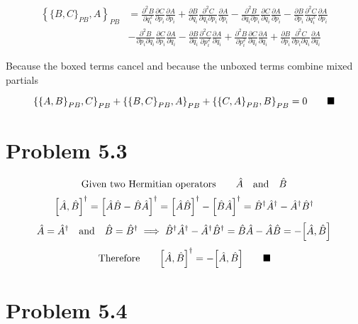 \documentclass{article}
\begin{document}
\begin{align*} \left\{ \{B,C\}_{PB},A \right\}_{PB}  
  &=  \boxed{\frac{\partial^2 B}{\partial q_{i}^2}				\frac{\partial C}{\partial p_{i}}\frac{\partial A}{\partial p_{i}}}
						+\frac{\partial B}{\partial q_{i}}						\frac{\partial^2 C}{\partial q_{i}\partial p_{i}} \frac{\partial A}{\partial p_{i}}
						-\frac{\partial^2 B}{\partial q_{i}\partial p_{i}}\frac{\partial C}{\partial q_{i}}\frac{\partial A}{\partial p_{i}}
						-\boxed{\frac{\partial B}{\partial p_{i}}						\frac{\partial^2 C}{\partial q_{i}^2} \frac{\partial A}{\partial p_{i}} } \\
		& -	\frac{\partial^2 B}{\partial p_{i}\partial q_{i}} \frac{\partial C}{\partial p_{i}}\frac{\partial A}{\partial q_{i}}
						-\boxed{\frac{\partial B}{\partial q_{i}}						\frac{\partial^2 C}{\partial p_{i}^2} \frac{\partial A}{\partial q_{i}}}
						+\boxed{\frac{\partial^2 B}{\partial p_{i}^2}				\frac{\partial C}{\partial q_{i}}\frac{\partial A}{\partial q_{i}}}
						+\frac{\partial B}{\partial p_{i}} 						\frac{\partial^2 C}{\partial p_{i}\partial q_{i}} \frac{\partial A}{\partial q_{i}} \end{align*}

Because the boxed terms cancel and because the unboxed terms combine mixed partials								

\[ \qty{ \qty{A,B}_{PB},C }_{PB}+\qty{ \qty{B,C}_{PB},A }_{PB}+\qty{ \qty{C,A}_{PB},B }_{PB}   =0 \qquad\blacksquare \]					
 

\section*{Problem 5.3}

\[ \text{Given two Hermitian operators} \qquad\hat{A}\qand\hat{B}\]
\[ \qty[\hat{A},\hat{B}]^{\dagger}=\qty[\hat{A}\hat{B}-\hat{B}\hat{A}]^{\dagger}=\qty[\hat{A}\hat{B}]^{\dagger}-\qty[\hat{B}\hat{A}]^{\dagger}=\hat{B}^{\dagger}\hat{A}^{\dagger}-\hat{A}^{\dagger}\hat{B}^{\dagger}  \]
\[ \hat{A}=\hat{A}^{\dagger}\qand\hat{B}=\hat{B}^{\dagger}\implies \hat{B}^{\dagger}\hat{A}^{\dagger}-\hat{A}^{\dagger}\hat{B}^{\dagger}=\hat{B}\hat{A}-\hat{A}\hat{B}=-\qty[\hat{A},\hat{B}] \]
\[ \text{Therefore}\qquad \qty[\hat{A},\hat{B}]^{\dagger}=-\qty[\hat{A},\hat{B}] \qquad\blacksquare \]					
 
\section*{Problem 5.4}
\end{document}
